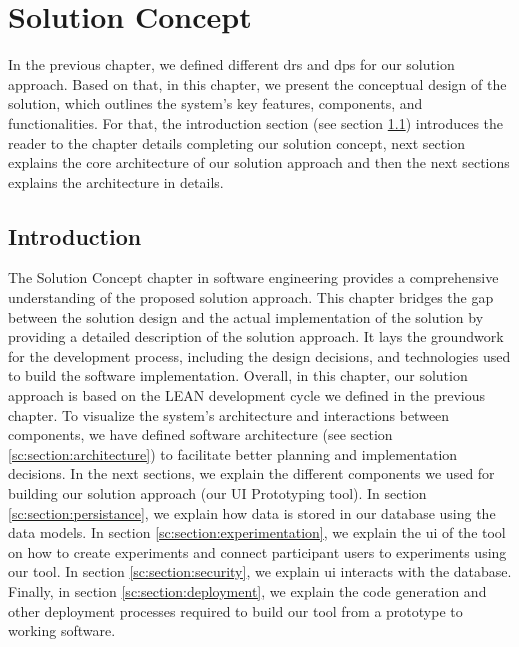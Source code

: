 
\chapter{Solution Concept}
\label{chap:concept}
\ifpdf
    \graphicspath{{Chapters/Solution-Concept/Figs/}{Chapters/Solution-Concept/Figs/}{Chapters/Solution-Concept/Figs/}}
\else
    \graphicspath{{Chapters/Solution-Concept/Figs/}{Chapters/Solution-Concept/Figs/}}
\fi
In the previous chapter, we defined different \ac{dr}s and \ac{dp}s for our solution approach. 
Based on that, in this chapter, we present the conceptual design of the solution, which outlines the system's key features, components, and functionalities. 
For that, the introduction section (see section \ref{sc:section:introduction}) introduces the reader to the chapter details completing our solution concept, next section explains the core architecture of our solution approach and then the next sections explains the architecture in details. 

\section{Introduction}
\label{sc:section:introduction}
The Solution Concept chapter in software engineering provides a comprehensive understanding of the proposed solution approach. 
This chapter bridges the gap between the solution design and the actual implementation of the solution by providing a detailed description of the solution approach. 
It lays the groundwork for the development process, including the design decisions, and technologies used to build the software implementation. 
Overall, in this chapter, our solution approach is based on the LEAN development cycle we defined in the previous chapter.
To visualize the system's architecture and interactions between components, we have defined software architecture (see section \ref{sc:section:architecture}) to facilitate better planning and implementation decisions.
In the next sections, we explain the different components we used for building our solution approach (our UI Prototyping tool). 
In section \ref{sc:section:persistance}, we explain how data is stored in our database using the data models. 
In section \ref{sc:section:experimentation}, we explain the \ac{ui} of the tool on how to create experiments and connect participant users to experiments using our tool.
In section \ref{sc:section:security}, we explain \ac{ui} interacts with the database. 
Finally, in section \ref{sc:section:deployment}, we explain the code generation and other deployment processes required to build our tool from a prototype to working software.

